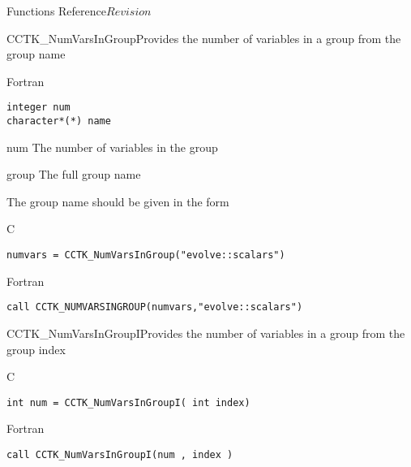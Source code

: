\begin{cactuspart}{ Functions Reference}{}{$Revision$}
\begin{FunctionDescription}{CCTK\_NumVarsInGroup}{Provides the number of variables in a group from the group name}
\begin{SynopsisSection}
\begin{Synopsis}{Fortran}
\begin{verbatim}
integer num
character*(*) name\end{verbatim}
\end{Synopsis}
\end{SynopsisSection}
\begin{ParameterSection}
\begin{Parameter}{num}
The number of variables in the group
\end{Parameter}
\begin{Parameter}{group}
The full group name
\end{Parameter}
\end{ParameterSection}
\begin{Discussion}
The group name should be given in the form 
\end{Discussion}
\begin{ExampleSection}
\begin{Example}{C}
\begin{verbatim}
numvars = CCTK_NumVarsInGroup("evolve::scalars")
\end{verbatim}
\end{Example}
\begin{Example}{Fortran}
\begin{verbatim}
call CCTK_NUMVARSINGROUP(numvars,"evolve::scalars")
\end{verbatim}
\end{Example}
\end{ExampleSection}
\end{FunctionDescription}



\begin{FunctionDescription}{CCTK\_NumVarsInGroupI}{Provides the number of variables in a group from the group index}
\label{CCTK-NumVarsInGroupI}
\begin{SynopsisSection}
\begin{Synopsis}{C}
\begin{verbatim}int num = CCTK_NumVarsInGroupI( int index)\end{verbatim}
\end{Synopsis}
\begin{Synopsis}{Fortran}
\begin{verbatim}call CCTK_NumVarsInGroupI(num , index )


\end{verbatim}
\end{Synopsis}
\end{SynopsisSection}
\end{FunctionDescription}
\end{cactuspart}
